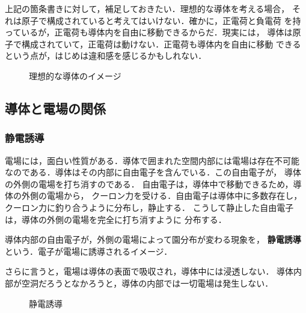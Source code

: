             上記の箇条書きに対して，補足しておきたい．理想的な導体を考える場合，
            それは原子で構成されていると考えてはいけない．確かに，正電荷と負電荷
            を持っているが，正電荷も導体内を自由に移動できるからだ．現実には，
            導体は原子で構成されていて，正電荷は動けない．正電荷も導体内を自由に移動
            できるという点が，はじめは違和感を感じるかもしれない．
                \begin{figure}[hbt]
                    \begin{center}
                        \caption{理想的な導体のイメージ}
                        \label{fig:DoutaiZetsuentai001}
                    \end{center}
                \end{figure}


    \subsection{導体と電場の関係}
        \subsubsection{静電誘導}
        電場には，面白い性質がある．導体で囲まれた空間内部には電場は存在不可能
        なのである．導体はその内部に自由電子を含んでいる．この自由電子が，
        導体の外側の電場を打ち消すのである．
        自由電子は，導体中で移動できるため，導体の外側の電場から，
        クーロン力を受ける．自由電子は導体中に多数存在し，
        クーロン力に釣り合うように分布し，静止する．
        こうして静止した自由電子は，導体の外側の電場を完全に打ち消すように
        分布する．

        導体内部の自由電子が，外側の電場によって園分布が変わる現象を，
        \textbf{静電誘導} という．電子が電場に誘導されるイメージ．

        さらに言うと，電場は導体の表面で吸収され，導体中には浸透しない．
        導体内部が空洞だろうとなかろうと，導体の内部では一切電場は発生しない．
                \begin{figure}[hbt]
                    \begin{center}
                        \caption{静電誘導}
                        \label{fig:Doutai_to_Denba001}
                    \end{center}
                \end{figure}


